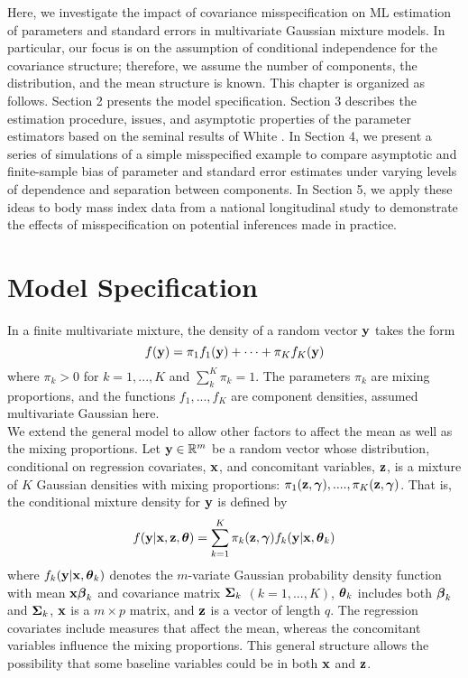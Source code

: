Here, we investigate the impact of covariance misspecification on ML estimation of parameters and standard errors in multivariate Gaussian mixture models. In particular, our focus is on the assumption of conditional independence for the covariance structure; therefore, we assume the number of components, the distribution, and the mean structure is known. This chapter is organized as follows. Section 2 presents the model specification. Section 3 describes the estimation procedure, issues, and asymptotic properties of the parameter estimators based on the seminal results of White \cite{white1982}.  In Section 4, we present a series of simulations of a simple misspecified example to compare asymptotic and finite-sample bias of parameter and standard error estimates under varying levels of dependence and separation between components. In Section 5, we apply these ideas to body mass index data from a national longitudinal study to demonstrate the effects of misspecification on potential inferences made in practice. 
\section{Model Specification}
In a finite multivariate mixture, the density of a random vector $\mathbf y$ takes the form
$$f(\mathbf y)=\pi_{1}f_{1}(\mathbf y)+\cdots+\pi_{K}f_{K}(\mathbf y)$$
where $\pi_{k}>0$ for $k=1,...,K$ and $\sum^{K}_{k}\pi_{k}=1$. The parameters $\pi_{k}$ are mixing proportions, and the functions $f_{1},...,f_{K}$ are component densities, assumed multivariate Gaussian here. \\

We extend the general model to allow other factors to affect the mean as well as the mixing proportions. Let $\mathbf y\in\mathbb{R}^{m}$ be a random vector whose distribution, conditional on regression covariates, $\mathbf x$, and concomitant variables, $\mathbf z$, is a mixture of $K$ Gaussian densities with mixing proportions: $\pi_{1}(\mathbf z,\boldsymbol \gamma),....,\pi_{K}(\mathbf z,\boldsymbol \gamma)$. That is, the conditional mixture density for $\mathbf y$ is defined by
\begin{align}
f(\mathbf y|\mathbf x,\mathbf z,\boldsymbol \theta)=\sum^{K}_{k=1}\pi_{k}(\mathbf z,\boldsymbol\gamma)f_{k}(\mathbf y|\mathbf x,\boldsymbol\theta_{k}) \label{mixdens}
\end{align}
where $f_{k}(\mathbf y|\mathbf x,\boldsymbol\theta_{k})$ denotes the $m$-variate Gaussian probability density function with mean $\mathbf x\boldsymbol \beta_{k}$ and covariance matrix $\boldsymbol\Sigma_{k}$ $(k=1,...,K)$, $\boldsymbol\theta_{k}$ includes both $\boldsymbol\beta_{k}$ and $\boldsymbol\Sigma_{k}$, $\mathbf x$ is a $m\times p$ matrix, and $\mathbf z$ is a vector of length $q$. The regression covariates include measures that affect the mean, whereas the concomitant variables influence the mixing proportions. This general structure allows the possibility that some baseline variables could be in both $\mathbf x$ and $\mathbf z$. \\

